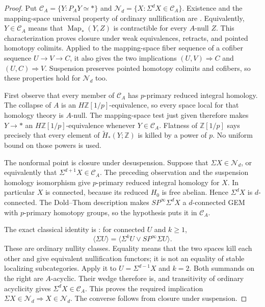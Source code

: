 \begin{proof}
Put $\mathcal C_A=\{Y:P_AY\simeq *\}$ and
$\mathcal N_d=\{X:\Sigma^dX\in\mathcal C_A\}$.
Existence and the mapping-space universal property of ordinary
nullification are \citet[Theorem 1.1]{ABousfield1996}.
Equivalently, $Y\in\mathcal C_A$ means that
$\operatorname{Map}_*(Y,Z)$ is contractible for every $A$-null $Z$.
This characterization proves closure under weak equivalences, retracts,
and pointed homotopy colimits.  Applied to the mapping-space fiber
sequence of a cofiber sequence $U\to V\to C$, it also gives the two
implications $(U,V)\Rightarrow C$ and $(U,C)\Rightarrow V$.
Suspension preserves pointed homotopy colimits and cofibers, so these
properties hold for $\mathcal N_d$ too.

First observe that every member of $\mathcal C_A$ has $p$-primary
reduced integral homology.  The collapse of $A$ is an
$H\mathbb Z[1/p]$-equivalence, so every space local for that homology
theory is $A$-null.  The mapping-space test just given therefore makes
$Y\to *$ an $H\mathbb Z[1/p]$-equivalence whenever
$Y\in\mathcal C_A$.  Flatness of $\mathbb Z[1/p]$ says precisely that
every element of $\widetilde H_*(Y;\mathbb Z)$ is killed by a power of
$p$.  No uniform bound on those powers is used.

The nonformal point is closure under desuspension.  Suppose that
$\Sigma X\in\mathcal N_d$, or equivalently that
$\Sigma^{d+1}X\in\mathcal C_A$.  The preceding observation and the
suspension homology isomorphism give $p$-primary reduced integral
homology for $X$.  In particular $X$ is connected, because its reduced
$H_0$ is free abelian.  Hence $\Sigma^dX$ is $d$-connected.
The Dold--Thom description makes
$SP^\infty\Sigma^dX$ a $d$-connected GEM with $p$-primary homotopy
groups, so the hypothesis puts it in $\mathcal C_A$.

The exact classical identity is
\citet[Theorem 3.3]{ABousfield1996}: for connected $U$ and $k\geq1$,
\[
 \langle\Sigma U\rangle
   =\langle\Sigma^kU\vee SP^\infty\Sigma U\rangle.
 \tag{A34.1.2}
\]
These are ordinary nullity classes.  Equality means that the two
spaces kill each other and give equivalent nullification functors;
it is not an equality of stable localizing subcategories.  Apply it to
$U=\Sigma^{d-1}X$ and $k=2$.  Both summands on the right are
$A$-acyclic.  Their wedge therefore is, and transitivity of ordinary
acyclicity gives $\Sigma^dX\in\mathcal C_A$.  This proves the required
implication $\Sigma X\in\mathcal N_d\Rightarrow X\in\mathcal N_d$.
The converse follows from closure under suspension.


\end{proof}
